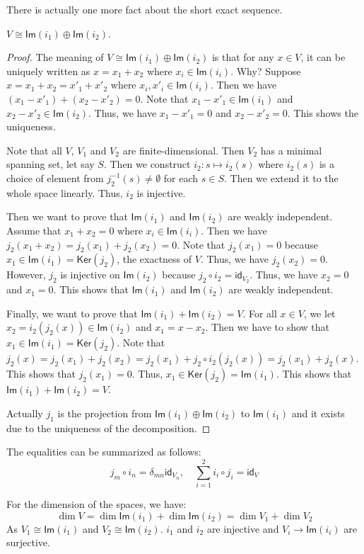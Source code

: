 \documentclass[
	11pt, %
	fleqn, %
	a4paper, %
]{LegrandOrangeBook}
\renewcommand{\ker}[1]{\mathsf{Ker}(#1)} %
\renewcommand{\Im}[1]{\mathsf{Im}(#1)} %
\newcommand{\id}{\mathsf{id}} %
\begin{document}
There is actually one more fact about the short exact sequence.
\begin{proposition}
    $V \cong \Im{i_1} \oplus \Im{i_2}$.
\end{proposition}
\begin{proof}
    The meaning of $V \cong \Im{i_1} \oplus \Im{i_2}$ is that for any $x \in V$, it can be uniquely written as $x = x_1 + x_2$ where $x_i \in \Im{i_i}$. Why? Suppose $x = x_1 + x_2 = x'_1 + x'_2$ where $x_i, x'_i \in \Im{i_i}$. Then we have $(x_1 - x'_1) + (x_2 - x'_2) = 0$. Note that $x_1 - x'_1 \in \Im{i_1}$ and $x_2 - x'_2 \in \Im{i_2}$. Thus, we have $x_1 - x'_1 = 0$ and $x_2 - x'_2 = 0$. This shows the uniqueness.

    Note that all $V$, $V_1$ and $V_2$ are finite-dimensional. Then $V_2$ has a minimal spanning set, let say $S$. Then we construct $i_2 : s \mapsto i_2(s)$ where $i_2(s)$ is a choice of element from $j_2^{-1}(s) \neq \emptyset$ for each $s \in S$. Then we extend it to the whole space linearly. Thus, $i_2$ is injective. 

    Then we want to prove that $\Im{i_1}$ and $\Im{i_2}$ are weakly independent. Assume that $x_1 + x_2 = 0$ where $x_i \in \Im{i_i}$. Then we have $j_2(x_1 + x_2) = j_2(x_1) + j_2(x_2) = 0$. Note that $j_2(x_1) = 0$ because $x_1 \in \Im{i_1} = \ker{j_2}$, the exactness of $V$. Thus, we have $j_2(x_2) = 0$. However, $j_2$ is injective on $\Im{i_2}$ because $j_2 \circ i_2 = \id_{V_2}$. Thus, we have $x_2 = 0$ and $x_1 = 0$. This shows that $\Im{i_1}$ and $\Im{i_2}$ are weakly independent.

    Finally, we want to prove that $\Im{i_1} + \Im{i_2} = V$. For all $x \in V$, we let $x_2 = i_2(j_2(x)) \in \Im{i_2}$ and $x_1 = x - x_2$. Then we have to show that $x_1 \in \Im{i_1} = \ker{j_2}$. Note that $j_2(x) = j_2(x_1) + j_2(x_2) = j_2(x_1) + j_2 \circ i_2(j_2(x)) = j_2(x_1) + j_2(x)$. This shows that $j_2(x_1) = 0$. Thus, $x_1 \in \ker{j_2} = \Im{i_1}$. This shows that $\Im{i_1} + \Im{i_2} = V$.

    Actually $j_1$ is the projection from $\Im{i_1} \oplus \Im{i_2}$ to $\Im{i_1}$ and it exists due to the uniqueness of the decomposition.
\end{proof}

The equalities can be summarized as follows:
\[
    j_m \circ i_n = \delta_{mn} \id_{V_n}, \quad \sum_{i=1}^{2} i_i \circ j_i = \id_V
\]

For the dimension of the spaces, we have:
\[
    \dim{V} = \dim{\Im{i_1}} + \dim{\Im{i_2}} = \dim{V_1} + \dim{V_2}
\]
As $V_1 \cong \Im{i_1}$ and $V_2 \cong \Im{i_2}$. $i_1$ and $i_2$ are injective and $V_i \to \Im{i_i}$ are surjective. 
\end{document}
